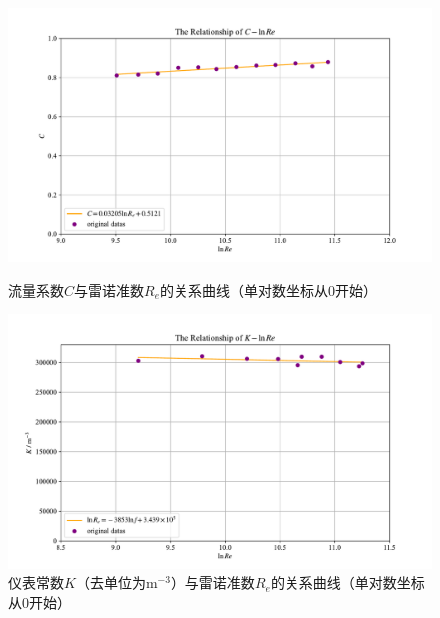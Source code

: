 \documentclass[UTF8,AutoFakeBold,a4paper]{article}
\begin{document}
\newpage
\begin{figure}[h]
	\centering
	\includegraphics[scale=0.6]{文丘里3}
	\caption{流量系数$C$与雷诺准数$R_{e}$的关系曲线（单对数坐标从0开始）}
	\label{fi3}
	
	\centering
	\includegraphics[scale=0.6]{涡轮3}
	\caption{仪表常数$K$（去单位为m$^{-3}$）与雷诺准数$R_{e}$的关系曲线（单对数坐标从0开始）}
	\label{fi4}
\end{figure}
\end{document}

